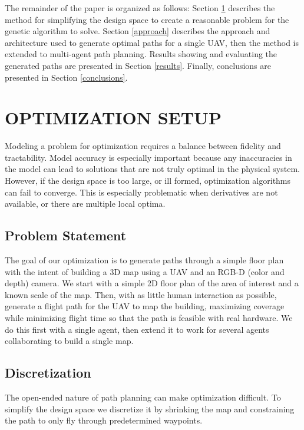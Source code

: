 \documentclass[letterpaper, 10 pt, conference]{ieeeconf}  %
\begin{document}
The remainder of the paper is organized as follows: Section \ref{setup} describes the method for simplifying the design space to create a reasonable problem for the genetic algorithm to solve. Section \ref{approach} describes the approach and architecture used to generate optimal paths for a single UAV, then the method is extended to multi-agent path planning.
Results showing and evaluating the generated paths are presented in Section \ref{results}. Finally, conclusions are presented in Section \ref{conclusions}.

\section{OPTIMIZATION SETUP}\label{setup}

Modeling a problem for optimization requires a balance between fidelity and tractability. Model accuracy is especially important because any inaccuracies in the model can lead to solutions that are not truly optimal in the physical system. However, if the design space is too large, or ill formed, optimization algorithms can fail to converge. This is especially problematic when derivatives are not available, or there are multiple local optima.

\subsection{Problem Statement}


The goal of our optimization is to generate paths through a simple floor plan with the intent of building a 3D map using a UAV and an RGB-D (color and depth) camera. We start with a simple 2D floor plan of the area of interest and a known scale of the map. Then, with as little human interaction as possible, generate a flight path for the UAV to map the building, maximizing coverage while minimizing flight time so that the path is feasible with real hardware. We do this first with a single agent, then extend it to work for several agents collaborating to build a single map.

\subsection{Discretization}

The open-ended nature of path planning can make optimization difficult. To simplify the design space we discretize it by shrinking the map and constraining the path to only fly through predetermined waypoints.
\end{document}
